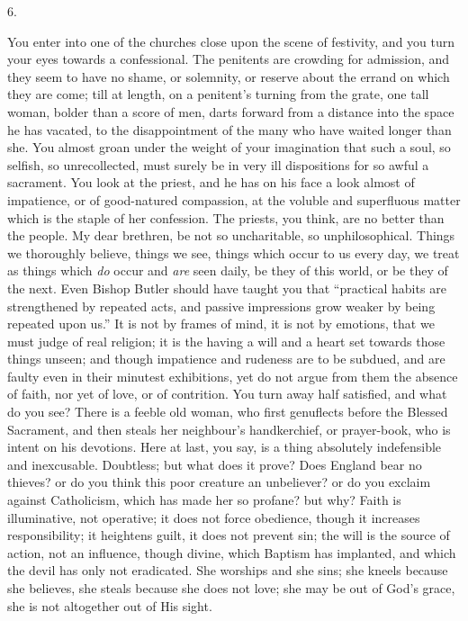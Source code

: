 6.

You enter into one of the churches close upon the scene of
festivity, and you turn your eyes towards a confessional. The
penitents are crowding for admission, and they seem to have no shame,
or solemnity, or reserve about the errand on which they are come; till
at length, on a penitent's turning from the grate, one tall woman,
bolder than a score of men, darts forward from a distance into the
space he has vacated, to the disappointment of the many who have
waited longer than she. You almost groan under the weight of your
imagination that such a soul, so selfish, so unrecollected, must
surely be in very ill dispositions for so awful a sacrament. You look
at the priest, and he has on his face a look almost of impatience, or
of good-natured compassion, at the voluble and superfluous matter
which is the staple of her confession. The priests, you think, are no
better than the people. My dear brethren, be not so uncharitable, so
unphilosophical. Things we thoroughly believe, things we see, things
which occur to us every day, we treat as things which \emph{do} occur
and \emph{are} seen daily, be they of this world, or be they of the
next. Even Bishop Butler should have taught you that ``practical
habits are strengthened by repeated acts, and passive impressions grow
weaker by being repeated upon us.'' It is not by frames of mind,
it is not by emotions, that we must judge of real religion; it is the
having a will and a heart set towards those things unseen; and though
impatience and rudeness are to be subdued, and are faulty even in
their minutest exhibitions, yet do not argue from them the absence of
faith, nor yet of love, or of contrition. You turn away half
satisfied, and what do you see? There is a feeble old woman, who first
genuflects before the Blessed Sacrament, and then steals her
neighbour's handkerchief, or prayer-book, who is intent on his
devotions. Here at last, you say, is a thing absolutely indefensible
and inexcusable. Doubtless; but what does it prove? Does England bear
no thieves? or do you think this poor creature an unbeliever? or do
you exclaim against Catholicism, which has made her so profane? but
why? Faith is illuminative, not operative; it does not force
obedience, though it increases responsibility; it heightens guilt, it
does not prevent sin; the will is the source of action, not an
influence, though divine, which Baptism has implanted, and which the
devil has only not eradicated. She worships and she sins; she kneels
because she believes, she steals because she does not love; she may be
out of God's grace, she is not altogether out of His sight.

